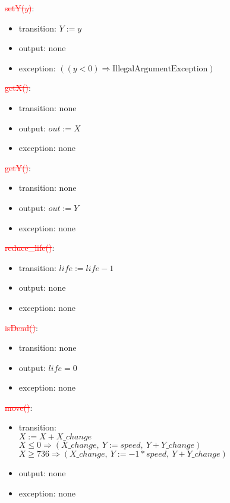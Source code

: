 \documentclass[12pt]{article}
\begin{document}
\noindent \textcolor{red}{\st{setY($\mathit{y}$)}}:
\begin{itemize}
\item transition: $Y := y$ 
\item output: none
\item exception: $((\mathit{y} < 0) \Rightarrow \text{IllegalArgumentException})$
\end{itemize}

\noindent \textcolor{red}{\st{getX()}}:
\begin{itemize}
\item transition: none
\item output: $out := X$
\item exception: none
\end{itemize}

\noindent \textcolor{red}{\st{getY()}}:
\begin{itemize}
\item transition: none
\item output: $out := Y$
\item exception: none
\end{itemize}

\noindent \textcolor{red}{\st{reduce\_life()}}:
\begin{itemize}
\item transition: $life := life - 1$
\item output: none
\item exception: none
\end{itemize}

\noindent \textcolor{red}{\st{isDead()}}:
\begin{itemize}
\item transition: none
\item output: $life = 0$
\item exception: none
\end{itemize}

\noindent \textcolor{red}{\st{move()}}:
\begin{itemize}
\item transition: \\
$X := X + X\_change$\\
$X \leq 0 \Rightarrow (X\_change,\ Y  := speed,\ Y + Y\_change)$\\
$X \geq 736 \Rightarrow (X\_change,\ Y  := -1*speed,\ Y + Y\_change)$
\item output: none
\item exception: none
\end{itemize}
\end{document}
